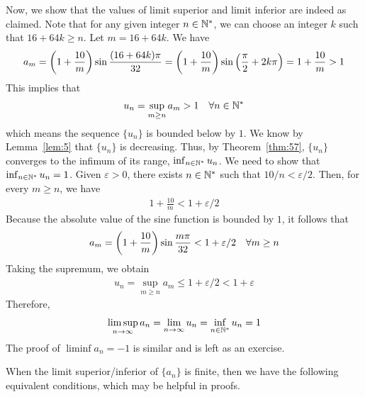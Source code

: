 \documentclass[thmcnt=section, 12pt]{my-elegantbook}
\begin{document}
\begin{example}
    Now, we show that the values of limit superior and limit inferior are indeed as claimed. Note that for any given integer $n \in \mathbb{N}^\ast$, we can choose an integer $k$ such that $16 + 64k \geq n$. Let $m = 16 + 64k$. We have 
    \begin{align*}
        a_m = \left( 1 + \frac{10}{m} \right) \sin \frac{(16 + 64k) \pi}{32}
        = \left( 1 + \frac{10}{m} \right) \sin \left( 
            \frac{\pi}{2} + 2k\pi
         \right)
        = 1 + \frac{10}{m}
        > 1
    \end{align*}
    This implies that 
    \begin{align}
        u_n = \sup_{m \geq n} a_m > 1
        \quad \forall n \in \mathbb{N}^\ast
    \end{align}
    which means the sequence $\{u_n\}$ is bounded below by $1$. We know by Lemma~\ref{lem:5} that $\{u_n\}$ is decreasing. Thus, by Theorem~\ref{thm:57}, $\{u_n\}$ converges to the infimum of its range, $\inf_{n \in \mathbb{N}^\ast} u_n$. We need to show that $\inf_{n \in \mathbb{N}^\ast} u_n = 1$. Given $\varepsilon > 0$, there exists $n \in \mathbb{N}^\ast$ such that $10 / n < \varepsilon/2$. Then, for every $m \geq n$, we have 
    \begin{align*}
        1 + \frac{10}{m} < 1 + \varepsilon/2
    \end{align*}
    Because the absolute value of the sine function is bounded by $1$, it follows that 
    \begin{align*}
        a_m = \left( 1 + \frac{10}{m} \right) \sin \frac{m \pi}{32} < 1 + \varepsilon/2
        \quad \forall m \geq n
    \end{align*}
    Taking the supremum, we obtain
    \begin{align*}
        u_n = \sup_{m \geq n} a_m
        \leq 1 + \varepsilon/2
        < 1 + \varepsilon
    \end{align*}
    Therefore, 
    \begin{align*}
        \limsup_{n \to \infty} a_n
        = \lim_{n \to \infty} u_n
        = \inf_{n \in \mathbb{N}^\ast} u_n = 1
    \end{align*}
    The proof of $\liminf a_n = -1$ is similar and is left as an exercise.
\end{example}


When the limit superior/inferior of $\{a_n\}$ is finite, then we have the following equivalent conditions, which may be helpful in proofs.
\end{document}
